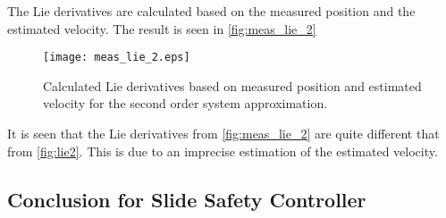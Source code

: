 The Lie derivatives are calculated based on the measured position and the estimated velocity. The result is seen in \autoref{fig:meas_lie_2}
\begin{figure}[H]
	\center
		\texttt{[image: meas\_lie\_2.eps]}
	\caption{Calculated Lie derivatives based on measured position and estimated velocity for the second order system approximation. }
    \label{fig:meas_lie_2}
\end{figure}
It is seen that the Lie derivatives from \autoref{fig:meas_lie_2} are quite different that from \autoref{fig:lie2}. This is due to an imprecise estimation of the estimated velocity.
\subsection{Conclusion for Slide Safety Controller}\label{subsec:conclusion-slide-safety}